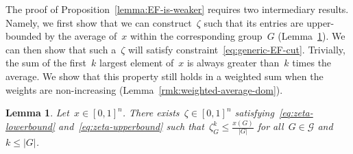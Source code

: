 \documentclass[a4paper,10pt]{article}
\newtheorem{lemma}[theorem]{Lemma}
\theoremstyle{definition}
\begin{document}
The proof of Proposition~\ref{lemma:EF-is-weaker} requires two intermediary results.
Namely, we first show that we can construct~$\zeta$ such that its entries are upper-bounded by the average of~$x$ within the corresponding group~$G$ (Lemma~\ref{rmk:zeta-lb}).
We can then show that such a~$\zeta$ will satisfy constraint~\eqref{eq:generic-EF-cut}.
Trivially, the sum of the first~$k$ largest element of~$x$ is always greater than~$k$ times the average.
We show that this property still holds in a weighted sum when the weights are non-increasing (Lemma~\ref{rmk:weighted-average-dom}).
\begin{lemma}
  \label{rmk:zeta-lb}
  Let~$x\in[0, 1]^n$. 
  There exists~$\zeta\in [0, 1]^n$ satisfying~\eqref{eq:zeta-lowerbound} and~\eqref{eq:zeta-upperbound} such that~$\zeta^k_G \leq \frac{x(G)}{|G|}$ for all~$G\in\mathcal{G}$ and~$k\leq|G|$.
\end{lemma}
\end{document}
